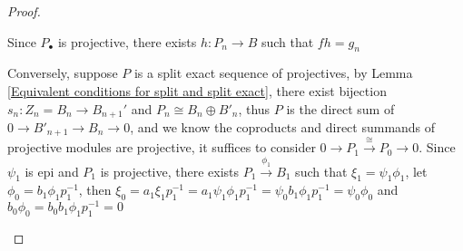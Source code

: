 \documentclass[../main.tex]{subfiles}
\begin{document}
\begin{proof}
\begin{center}
\end{center}
Since $P_\bullet$ is projective, there exists $h:P_n\to B$ such that $fh=g_n$ \par
Conversely, suppose $P$ is a split exact sequence of projectives, by Lemma \ref{Equivalent conditions for split and split exact}, there exist bijection $s_n:Z_n=B_n\to B_{n+1}'$ and $P_n\cong B_n\oplus B'_n$, thus $P$ is the direct sum of $0\to B'_{n+1}\to B_n\to0$, and we know the coproducts and direct summands of projective modules are projective, it suffices to consider $0\to P_1\xrightarrow{\cong}P_0\to 0$. Since $\psi_1$ is epi and $P_1$ is projective, there exists $P_1\xrightarrow{\phi_1}B_1$ such that $\xi_1=\psi_1\phi_1$, let $\phi_0=b_1\phi_1p_1^{-1}$, then $\xi_0=a_1\xi_1p_1^{-1}=a_1\psi_1\phi_1p_1^{-1}=\psi_0b_1\phi_1p_1^{-1}=\psi_0\phi_0$ and $b_0\phi_0=b_0b_1\phi_1p_1^{-1}=0$
\begin{center}
\end{center}
\end{proof}
\end{document}
